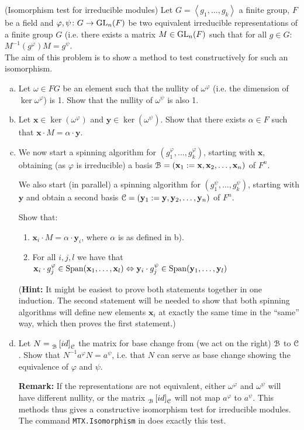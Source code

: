 \documentclass[leqno]{article}
\begin{document}
\newpage
\begin{problem}
(Isomorphism test for irreducible modules)
Let $G=\left\langle g_1,\ldots,g_k\right\rangle$ a finite group,
$F$ be a field and
$\varphi,\psi\colon G\to\mathrm{GL}_n(F)$ be two equivalent irreducible
representations of a finite group $G$ (i.e.  there exists a matrix
$M\in\mathrm{GL}_n(F)$ such that for all $g\in G$: $M^{-1}(g^\varphi)M=g^\psi$.\\
The aim of this problem is to show a method to test constructively
for such an isomorphism.
\begin{enumerate}[(a)]
    \item Let $\omega\in FG$ be an element such that the nullity of $\omega^\varphi$
(i.e. the dimension of $\ker\omega^\varphi$)
is 1. Show that the nullity of $\omega^\psi$ is also 1.
\item Let $\mathbf{x}\in\ker(\omega^\varphi)$ and $\mathbf{y}\in\ker(\omega^\psi)$.
Show that there exists $\alpha\in F$ such that $\mathbf{x}\cdot
M=\alpha\cdot\mathbf{y}$.
\item We now start a spinning algorithm for 
$(g_1^\varphi,\ldots,g_k^\varphi)$, starting with $\mathbf{x}$, obtaining (as
$\varphi$ is irreducible) a basis
${\EuScript B}=(\mathbf{x}_1:=\mathbf{x},\mathbf{x}_2,\ldots,\mathbf{x}_n)$ of $F^n$.

We also start (in parallel) 
a spinning algorithm for 
$(g_1^\psi,\ldots,g_k^\psi)$, starting with $\mathbf{y}$ and obtain a second
basis ${\EuScript C}=(\mathbf{y}_1:=\mathbf{y},\mathbf{y}_2,\ldots,\mathbf{y}_n)$ of $F^n$.

Show that:
\begin{enumerate}[1.]
\item $\mathbf{x}_i\cdot M=\alpha\cdot\mathbf{y}_i$, where $\alpha$ is as
defined in b).
\item For all $i,j,l$ we have that 
$\mathbf{x}_i\cdot g_j^\varphi\in{\rm Span}(\mathbf{x}_1,\ldots,\mathbf{x}_l)
\Leftrightarrow
\mathbf{y}_i\cdot g_j^\psi\in{\rm Span}(\mathbf{y}_1,\ldots,\mathbf{y}_l)$
\end{enumerate}
({\bf Hint:} It might be easiest to prove both statements together in one
induction. The second statement will be needed to show that both spinning
algorithms will define new elements $\mathbf{x}_i$ at exactly the same time in
the ``same'' way, which then proves the first statement.)\\
\item Let $N=\matbas{\Bb}{id}{\Cb}$ the matrix for base change from
(we act on the right) ${\EuScript B}$ to ${\EuScript C}$. Show that $N^{-1}a^\varphi N=a^\psi$,
i.e. that $N$ can serve as base change showing the equivalence of $\varphi$
and $\psi$.\medskip

{\bf Remark:} If the representations are not equivalent, either $\omega^\varphi$ and
$\omega^\psi$ will have different nullity, or the matrix
$\matbas{\Bb}{id}{\Cb}$ will not map $a^\varphi$ to $a^\psi$. This
methods thus gives a constructive isomorphism test for irreducible modules.
The command {\tt MTX.Isomorphism} in {\GAP} does exactly this test.
\end{enumerate}
\end{problem}
\end{document}
